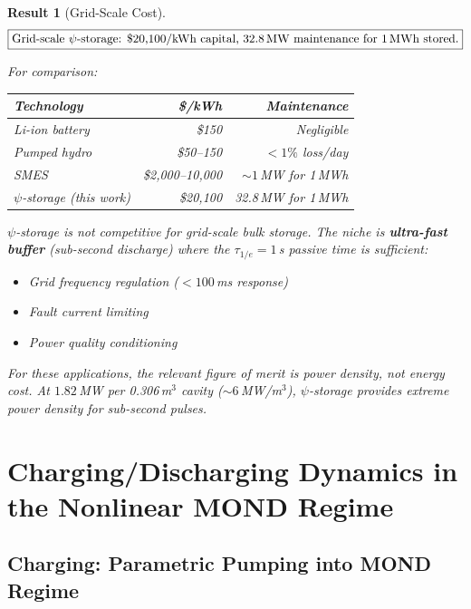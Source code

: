 \documentclass[11pt]{article}
\newtheorem{result}[theorem]{Result}
\theoremstyle{definition}
\theoremstyle{remark}
\begin{document}
\begin{result}[Grid-Scale Cost]\label{res:grid-cost}
\begin{equation}
\boxed{\text{Grid-scale } \psi\text{-storage: \$20,100/kWh capital, }
32.8\,\text{MW maintenance for 1\,MWh stored.}}
\end{equation}

For comparison:
\begin{center}
\begin{tabular}{@{}lrr@{}}
\toprule
Technology & \$/kWh & Maintenance \\
\midrule
Li-ion battery & \$150 & Negligible \\
Pumped hydro & \$50--150 & $< 1\%$ loss/day \\
SMES & \$2,000--10,000 & $\sim 1$\,MW for 1\,MWh \\
$\psi$-storage (this work) & \$20,100 & 32.8\,MW for 1\,MWh \\
\bottomrule
\end{tabular}
\end{center}

$\psi$-storage is not competitive for grid-scale bulk storage.
The niche is \textbf{ultra-fast buffer} (sub-second discharge)
where the $\tau_{1/e} = 1$\,s passive time is sufficient:
\begin{itemize}
\item Grid frequency regulation ($< 100$\,ms response)
\item Fault current limiting
\item Power quality conditioning
\end{itemize}

For these applications, the relevant figure of merit is
power density, not energy cost. At $1.82$\,MW per 0.306\,m$^3$
cavity ($\sim 6$\,MW/m$^3$), $\psi$-storage provides extreme
power density for sub-second pulses.
\end{result}

\section{Charging/Discharging Dynamics in the Nonlinear MOND Regime}
\label{sec:charging-dynamics}

\subsection{Charging: Parametric Pumping into MOND Regime}
\end{document}
